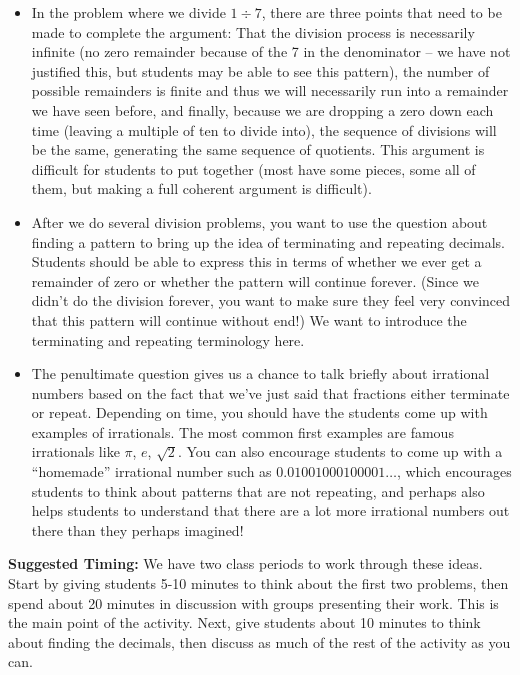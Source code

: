 \documentclass[noauthor, nooutcomes, handout]{ximera}
\begin{document}
\begin{instructorNotes}
\begin{itemize}
  \item In the problem where we divide $1 \div 7$, there are three points that need to be made to complete the argument:  That the division process is necessarily infinite (no zero remainder because of the 7 in the denominator -- we have not justified this, but students may be able to see this pattern), the number of possible remainders is finite and thus we will necessarily run into a remainder we have seen before, and finally, because we are dropping a zero down each time (leaving a multiple of ten to divide into), the sequence of divisions will be the same, generating the same sequence of quotients. This argument is difficult for students to put together (most have some  pieces, some all of them, but making a full coherent argument is difficult).
  
  \item After we do several division problems, you want to use the question about finding a pattern to bring up the idea of terminating and repeating decimals. Students should be able to express this in terms of whether we ever get a remainder of zero or whether the pattern will continue forever. (Since we didn't do the division forever, you want to make sure they feel very convinced that this pattern will continue without end!) We want to introduce the terminating and repeating terminology here.


\item The penultimate question gives us a chance to talk briefly about irrational numbers based on the fact that we've just said that fractions either terminate or repeat. Depending on time, you should have the students come up with examples of irrationals. The most common first examples are famous irrationals like $\pi$, $e$, $\sqrt{2}$. You can also encourage students to come up with a ``homemade'' irrational number such as $0.01001000100001\dots$, which encourages students to think about patterns that are not repeating, and perhaps also helps students to understand that there are a lot more irrational numbers out there than they perhaps imagined! 


 \end{itemize}


{\bf Suggested Timing:} We have two class periods to work through these ideas. Start by giving students 5-10 minutes to think about the first two problems, then spend about 20 minutes in discussion with groups presenting their work. This is the main point of the activity. Next, give students about 10 minutes to think about finding the decimals,  then discuss as much of the rest of the activity as you can. 
\end{instructorNotes}
\end{document}
